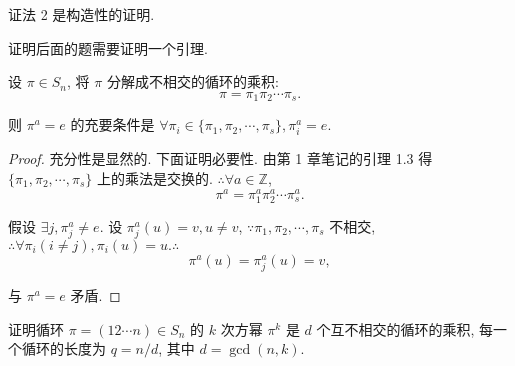 \documentclass[color=black,device=normal,lang=cn,mode=geye]{elegantnote}
\begin{document}
\begin{note}
    证法 2 是构造性的证明.
\end{note}
证明后面的题需要证明一个引理.
\begin{lemma}\label{l4.1}
    设 $\pi\in S_n$, 将 $\pi$ 分解成不相交的循环的乘积:
    \[\pi=\pi_1\pi_2\cdots\pi_s.\]

    则 $\pi^a=e$ 的充要条件是 $\forall\pi_i\in\{\pi_1,\pi_2,\cdots,\pi_s\},\pi_i^a=e$.
\end{lemma}
\begin{proof}
    充分性是显然的. 下面证明必要性. 由第 1 章笔记的引理 1.3 得 $\{\pi_1,\pi_2,\cdots,\pi_s\}$ 上的乘法是交换的. $\therefore\forall a\in\mathbb{Z}$,
    \[\pi^a=\pi_1^a\pi_2^a\cdots\pi_s^a.\]

    假设 $\exists j,\pi_j^a\neq e$. 设 $\pi_j^a(u)=v,u\neq v$, $\because\pi_1,\pi_2,\cdots,\pi_s$ 不相交, $\therefore\forall\pi_i(i\neq j),\pi_i(u)=u.\therefore$
    \[\pi^a(u)=\pi_j^a(u)=v,\]

    与 $\pi^a=e$ 矛盾.
\end{proof}
\begin{exercise}%
    证明循环 $\pi=(12\cdots n)\in S_n$ 的 $k$ 次方幂 $\pi^k$ 是 $d$ 个互不相交的循环的乘积, 每一个循环的长度为 $q=n/d$, 其中 $d=\operatorname{gcd}(n,k)$.
\end{exercise}
\end{document}
